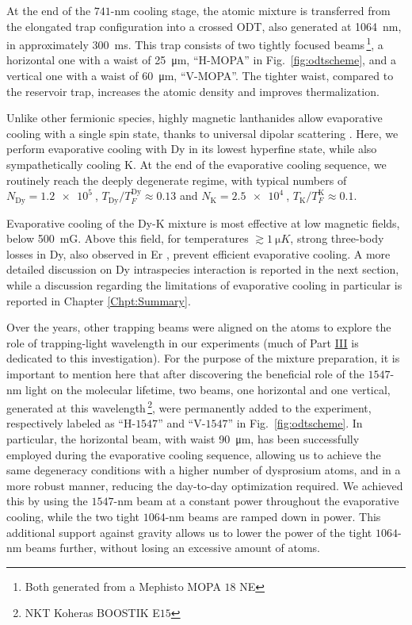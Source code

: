 At the end of the $741$-nm cooling stage, the atomic mixture is transferred from the elongated trap configuration into a crossed \ac{ODT}, also generated at \SI{1064}{nm}, in approximately \SI{300}{ms}. This trap consists of two tightly focused beams\,\footnote{Both generated from a Mephisto MOPA $18$ NE}, a horizontal one with a waist of \SI{25}{\micro m}, ``H-MOPA'' in Fig.~\ref{fig:odtscheme}, and  a vertical one with a waist of \SI{60}{\micro m}, ``V-MOPA''. The tighter waist, compared to the reservoir trap, increases the atomic density and improves thermalization.

Unlike other fermionic species, highly magnetic lanthanides allow evaporative cooling with a single spin state, thanks to universal dipolar scattering \cite{Lu2012qdd, Aikawa2014rfd}. Here, we perform evaporative cooling with Dy in its lowest hyperfine state, while also sympathetically cooling K. At the end of the evaporative cooling sequence, we routinely reach the deeply degenerate regime, with typical numbers of $N_{\textrm{Dy}}=\SI{1.2e5}{}$, $T_{\textrm{Dy}}/T^{\textrm{Dy}}_F\approx0.13$ and $N_{\textrm{K}}=\SI{2.5e4}{}$, $T_{\textrm{K}}/T^{\textrm{K}}_F\approx0.1$. 

Evaporative cooling of the Dy-K mixture is most effective at low magnetic fields, below \SI{500}{mG}. Above this field, for temperatures $\gtrsim\SI{1}{\micro K}$, strong three-body losses in Dy, also observed in Er \cite{Krstajic2025cot}, prevent efficient evaporative cooling. A more detailed discussion on Dy intraspecies interaction is reported in the next section, while a discussion regarding the limitations of evaporative cooling in particular is reported in Chapter \ref{Chpt:Summary}. 


Over the years, other trapping beams were aligned on the atoms to explore the role of trapping-light wavelength in our experiments (much of Part \hyperref[pt:MakingProbing]{III} is dedicated to this investigation). For the purpose of the mixture preparation, it is important to mention here that after discovering the beneficial role of the $1547$-nm light on the molecular lifetime, two beams, one horizontal and one vertical, generated at this wavelength\,\footnote{NKT Koheras BOOSTIK E$15$}, were permanently added to the experiment, respectively labeled as ``H-$1547$'' and ``V-$1547$'' in Fig.~\ref{fig:odtscheme}. In particular, the horizontal beam, with waist \SI{90}{\micro m}, has been successfully employed during the evaporative cooling sequence, allowing us to achieve the same degeneracy conditions with a higher number of dysprosium atoms, and in a more robust manner, reducing the day-to-day optimization required. We achieved this by using the $1547$-nm beam at a constant power throughout the evaporative cooling, while the two tight $1064$-nm beams are ramped down in power. This additional support against gravity allows us to lower the power of the tight $1064$-nm beams further, without losing an excessive amount of atoms. 

